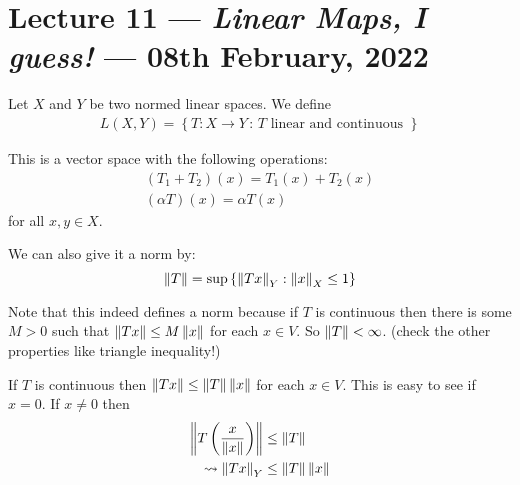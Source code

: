 \section{Lecture 11 --- \textit{Linear Maps, I guess!} --- 08th February, 2022}

Let $X$ and $Y$ be two normed linear spaces. We define
\begin{align*}
    L(X,Y) =\left\{ T: X\to Y \, : \, T \text{ linear and continuous } \right\}
\end{align*}

This is a vector space with the following operations:
\begin{align*}
    (T_{1} + T_{2})(x) = T_{1} (x) + T_{2} (x) \\
    (\alpha T ) (x) = \alpha T(x)
\end{align*}
for all $x,y \in X$.

We can also give it a norm by:
\begin{equation*}
    \left\lVert T \right\rVert=\sup \left\{ \left\lVert Tx \right\rVert_{Y} : \left\lVert x \right\rVert_{X} \le 1 \right\}
\end{equation*}

Note that this indeed defines a norm because if $T$ is continuous then there is some $M > 0$ such that $\left\lVert Tx \right\rVert \le M \left\lVert x \right\rVert$ for each $x \in V$. So $\left\lVert T \right\rVert < \infty$. (check the other properties like triangle inequality!)

\begin{observation}
    If $T$ is continuous then $\left\lVert Tx \right\rVert \le \left\lVert T \right\rVert\left\lVert x \right\rVert$ for each $x\in V$. This is easy to see if $x=0$. If $x\ne 0$ then 
    \begin{align*}
	\left\lVert T \left( \frac{x}{\left\lVert x \right\rVert} \right) \right\rVert &\le \left\lVert T \right\rVert \\
	\leadsto \left\lVert Tx \right\rVert_{Y} &\le \left\lVert T \right\rVert \left\lVert x \right\rVert
    \end{align*}
\end{observation}

